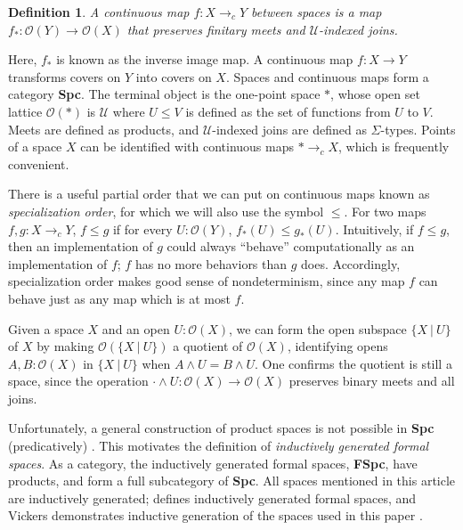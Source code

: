 \documentclass[conference]{IEEEtran}
\newtheorem{definition}{Definition}
\newcommand{\cto}{\to_c}
\newcommand{\Type}{\mathcal{U}}
\newcommand{\suchthat}{\ |\ }
\newcommand{\One}{\ast}
\newcommand{\Open}[1]{\mathcal{O}({#1})}
\newcommand{\comment}[1]{}
\begin{document}
\begin{definition}
A \emph{continuous map} $f : X \cto Y$ between spaces is a map $f_* : \Open{Y} \to \Open{X}$ that preserves finitary meets and $\Type$-indexed joins.
\end{definition}

Here, $f_*$ is known as the inverse image map. A continuous map $f : X \to Y$ transforms covers on $Y$ into covers on $X$. Spaces and continuous maps form a category \textbf{Spc}. The terminal object is the one-point space $\One$, whose open set lattice $\Open{\One}$ is $\Type$ where $U \le V$ is defined as the set of functions from $U$ to $V$. Meets are defined as products, and $\Type$-indexed joins are defined as $\Sigma$-types. Points of a space $X$ can be identified with continuous maps $\One \cto X$, which is frequently convenient.

There is a useful partial order that we can put on continuous maps known as \emph{specialization order}, for which we will also use the symbol $\le$. For two maps $f, g : X \cto Y$, $f \le g$ if for every $U : \Open{Y}$, $f_*(U) \le g_*(U)$. Intuitively, if $f \le g$, then an implementation of $g$ could always ``behave'' computationally as an implementation of $f$; $f$ has no more behaviors than $g$ does. Accordingly, specialization order makes good sense of nondeterminism, since any map $f$ can behave just as any map which is at most $f$.

Given a space $X$ and an open $U : \Open{X}$, we can form the open subspace $\{ X \suchthat U \}$ of $X$ by making $\Open{\{X \suchthat U \}}$ a quotient of $\Open{X}$, identifying opens $A, B : \Open{X}$ in $\{ X \suchthat U \}$ when $A \wedge U = B \wedge U$. One confirms the quotient is still a space, since the operation $\cdot \wedge U : \Open{X} \to \Open{X}$ preserves binary meets and all joins.

Unfortunately, a general construction of product spaces is not possible in \textbf{Spc} (predicatively) \cite{coquand2003}. This motivates the definition of \emph{inductively generated formal spaces}. As a category, the inductively generated formal spaces, \textbf{FSpc}, have products, and form a full subcategory of \textbf{Spc}. All spaces mentioned in this article are inductively generated; \cite{coquand2003} defines inductively generated formal spaces, and Vickers demonstrates inductive generation of the spaces used in this paper \cite{vickersmetric, vickersdoublepowerlocale, SublocFT}.

\comment{
\begin{definition}
An \emph{inductively generated formal space} is a preorder $S$ together with a function 
\[
C : S \to \Sigma (I : \Type).\ I \to (S \to \Type),
\]
called an \emph{axiom set}.
\end{definition}

The preorder $S$ represents a base for the opens of the space. The construction in \cite{coquand2003} generates the ``free'' space $X$ whose base is $S$, with an inclusion of the base $y : S \to \Open{X}$ that satisfies, for each $s : S$, letting $(I, U) = C(s)$, for any $i : I$, 
\begin{mathpar}
\inferrule*
  {}
  {ya \le \bigvee_{b : U_i} yb}
\end{mathpar}
}
\end{document}
